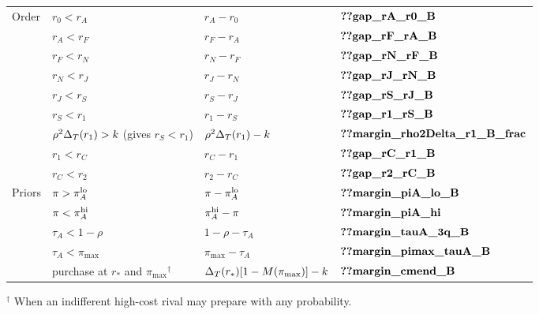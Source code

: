 \begin{table}[p]
\begin{tabular}{@{}llll@{}}
Order & \(r_0<r_A\) & \(r_A-r_0\) & \(\reg{gap_rA_r0_B}\)\\
 & \(r_A<r_F\) & \(r_F-r_A\) & \(\reg{gap_rF_rA_B}\)\\
 & \(r_F<r_N\) & \(r_N-r_F\) & \(\reg{gap_rN_rF_B}\)\\
 & \(r_N<r_J\) & \(r_J-r_N\) & \(\reg{gap_rJ_rN_B}\)\\
 & \(r_J<r_S\) & \(r_S-r_J\) & \(\reg{gap_rS_rJ_B}\)\\
 & \(r_S<r_1\) & \(r_1-r_S\) & \(\reg{gap_r1_rS_B}\)\\
 & \(\rho^2\Delta_T(r_1)>k\) (gives \(r_S<r_1\)) & \(\rho^2\Delta_T(r_1)-k\) & \(\reg{margin_rho2Delta_r1_B_frac}\)\\
 & \(r_1<r_C\) & \(r_C-r_1\) & \(\reg{gap_rC_r1_B}\)\\
 & \(r_C<r_2\) & \(r_2-r_C\) & \(\reg{gap_r2_rC_B}\)\\
Priors & \(\pi>\pi_A^{\rm lo}\) & \(\pi-\pi_A^{\rm lo}\) & \(\reg{margin_piA_lo_B}\)\\
 & \(\pi<\pi_A^{\rm hi}\) & \(\pi_A^{\rm hi}-\pi\) & \(\reg{margin_piA_hi}\)\\
 & \(\tau_A<1-\rho\) & \(1-\rho-\tau_A\) & \(\reg{margin_tauA_3q_B}\)\\
 & \(\tau_A<\pi_{\max}\) & \(\pi_{\max}-\tau_A\) & \(\reg{margin_pimax_tauA_B}\)\\
 & purchase at \(r_*\) and \(\pi_{\max}\)\(^\dagger\) & \(\Delta_T(r_*)[1-M(\pi_{\max})]-k\) & \(\reg{margin_cmend_B}\)\\
\bottomrule
\end{tabular}
\par\medskip
\begin{minipage}{0.95\linewidth}\scriptsize
\(^\dagger\) When an indifferent high-cost rival may prepare with any probability.
\end{minipage}
\end{table}

